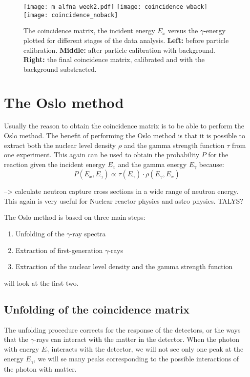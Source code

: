 \documentclass[11pt,a4wide]{article}
\begin{document}
\begin{figure}[htp]
\centering
\texttt{[image: m\_alfna\_week2.pdf]}
\texttt{[image: coincidence\_wback]}
\texttt{[image: coincidence\_noback]}
\caption{The coincidence matrix, the incident energy $E_x$ versus the $\gamma$-energy plotted for different stages of the data analysis. \textbf{Left:} before particle calibration. \textbf{Middle:} after particle calibration with background. \textbf{Right:} the final coincidence matrix, calibrated and with the background substracted.}
\label{fig: coincidence}
\end{figure}



\section{The Oslo method}
Usually the reason to obtain the coincidence matrix is to be able to perform the Oslo method. The benefit of performing the Oslo method is that it is possible to extract both the nuclear level density $\rho$ and the gamma strength function $\tau$ from one experiment. This again can be used to obtain the probability $P$ for the reaction given the incident energy $E_x$ and the gamma energy $E_\gamma$ because:
\[
P(E_x,E_\gamma) \propto \tau(E_\gamma)\cdot \rho(E_\gamma, E_x)
\]


--> calculate neutron capture cross sections in a wide range of neutron energy. %
This again is very useful for Nuclear reactor physics and astro physics. 
TALYS?

The Oslo method is based on three main steps:
\begin{enumerate}
\item Unfolding of the $\gamma$-ray spectra
\item Extraction of first-generation $\gamma$-rays
\item Extraction of the nuclear level density and the gamma strength function
\end{enumerate}
will look at the first two. 


\subsection{Unfolding of the coincidence matrix}
The unfolding procedure corrects for the response of the detectors, or the ways that the $\gamma$-rays can interact with the matter in the detector. When the photon with energy $E_\gamma$ interacts with the detector, we will not see only one peak at the energy $E_\gamma$, we will se many peaks corresponding to the possible interactions of the photon with matter. 
\end{document}
